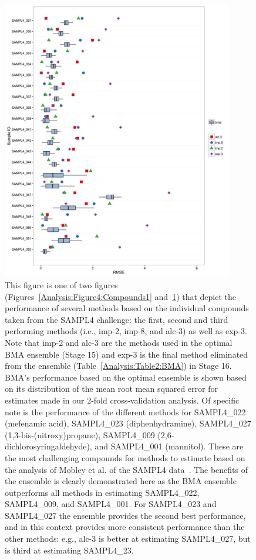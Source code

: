 \documentclass[12pt]{article}
\newcommand{\+}[1]{\ensuremath{\mathbf{#1}}}
\begin{document}
\begin{figure}
	\centering
	\includegraphics[keepaspectratio,width=0.9\textwidth]{Figures/compounds_2}
	\caption{This figure is one of two figures (Figures~\ref{Analysis:Figure4:Compounds1} and~\ref{Analysis:Figure5:Compounds2}) that depict the performance of several methods based on the individual compounds taken from the SAMPL4 challenge: the first, second and third performing methods (i.e., imp-2, imp-8, and alc-3) as well as exp-3. Note that imp-2 and alc-3 are the methods used in the optimal BMA ensemble (Stage 15) and exp-3 is the final method eliminated from the ensemble (Table~\ref{Analysis:Table2:BMA}) in Stage 16. BMA's performance based on the optimal ensemble is shown based on its distribution of the mean root mean squared error for estimates made in our 2-fold cross-validation analysis. Of specific note is the performance of the different methods for SAMPL4\_022 (mefenamic acid), SAMPL4\_023 (diphenhydramine), SAMPL4\_027 (1,3-bis-(nitroxy)propane), SAMPL4\_009 (2,6-dichlorosyringaldehyde), and SAMPL4\_001 (mannitol). These are the most challenging compounds for methods to estimate based on the analysis of Mobley et al. of the SAMPL4 data~\cite{Mobley:2014}. The benefits of the ensemble is clearly demonstrated here as the BMA ensemble outperforms all methods in estimating SAMPL4\_022, SAMPL4\_009, and SAMPL4\_001. For SAMPL4\_023 and SAMPL4\_027 the ensemble provides the second best performance, and in this context provides more consistent performance than the other methods: e.g., alc-3 is better at estimating SAMPL4\_027, but is third at estimating SAMPL4\_23.}
	\label{Analysis:Figure5:Compounds2}
\end{figure}
\end{document}
